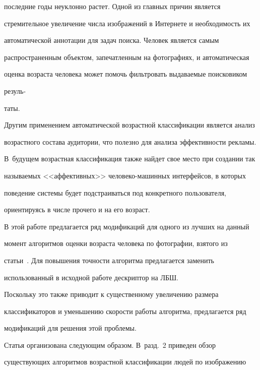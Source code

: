 последние годы неуклонно растет. Одной из главных причин является

стремительное увеличение числа изображений в Интернете и необходимость их

автоматической аннотации для задач поиска. Человек является самым

распространенным объектом, запечатленным на фотографиях, и автоматическая

оценка возраста человека может помочь фильтровать выдаваемые поисковиком

резуль-\linebreak\vspace*{-12pt}



\pagebreak



\noindent

таты.

Другим применением автоматической возрастной классификации является анализ

возрастного состава аудитории, что полезно для анализа эффективности рекламы.

В~будущем возрастная классификация также найдет свое место при создании так

называемых <<аффективных>> человеко-машинных интерфейсов, в которых

поведение системы будет подстраиваться под конкретного пользователя,

ориентируясь в числе прочего и на его возраст.



В этой работе предлагается ряд модификаций для одного из лучших на данный

момент алгоритмов оценки возраста человека по фотографии, взятого из

статьи~\cite{5-r}. Для повышения точности алгоритма предлагается заменить

использованный в исходной работе дескриптор на ЛБШ.

Поскольку это также приводит к существенному увеличению размера

классификаторов и уменьшению скорости работы алгоритма, предлагается ряд

модификаций для решения этой проблемы.



Статья организована следующим образом. В~разд.~2 приведен обзор

существующих алгоритмов возрастной классификации людей по изображению


